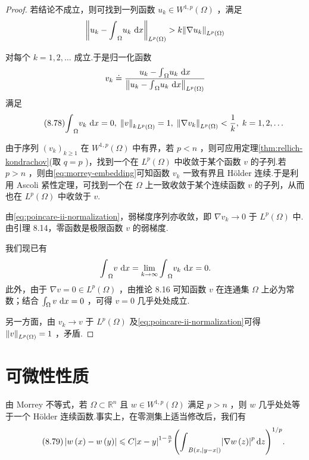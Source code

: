 \begin{proof}
若结论不成立，则可找到一列函数 ${u}_{k} \in  {W}^{1,p}\left( \Omega \right)$ ，满足
\[
\norm{{u}_{k} - {\int }_{\Omega }{u}_{k}\,\mathop{}\!\mathrm{d} x}_{{L}^{p}\left( \Omega \right) } > k\norm{\nabla {u}_{k}}_{{L}^{p}\left( \Omega \right) }
\]

对每个 $k = 1,2,\ldots$ 成立.于是归一化函数
\[
{v}_{k} \doteq  \frac{{u}_{k} - {\int }_{\Omega }{u}_{k}\,\mathop{}\!\mathrm{d} x}{\norm{{u}_{k} - {\int }_{\Omega }{u}_{k}\,\mathop{}\!\mathrm{d} x}_{{L}^{p}\left( \Omega \right) }}
\]
满足
\begin{equation}\tag{8.78}\label{eq:poincare-ii-normalization}
{\int }_{\Omega }{v}_{k}\,\mathop{}\!\mathrm{d} x = 0,\;{\norm{v}_{k}}_{{L}^{p}\left( \Omega \right) } = 1,\;{\norm{\nabla {v}_{k}}}_{{L}^{p}\left( \Omega \right) } < \frac{1}{k},\;k = 1,2,\ldots
\end{equation}

由于序列 ${\left( {v}_{k}\right) }_{k \geq  1}$ 在 ${W}^{1,p}\left( \Omega \right)$ 中有界，若 $p < n$ ，则可应用定理\ref{thm:rellich-kondrachov}(取 $q = p$ )，找到一个在 ${L}^{p}\left( \Omega \right)$ 中收敛于某个函数 $v$ 的子列.若 $p > n$ ，则由\eqref{eq:morrey-embedding}可知函数 ${v}_{k}$ 一致有界且 Hölder 连续.于是利用 Ascoli 紧性定理，可找到一个在 $\Omega$ 上一致收敛于某个连续函数 $v$ 的子列，从而也在 ${L}^{p}\left( \Omega \right)$ 中收敛于 $v$.

由\eqref{eq:poincare-ii-normalization}，弱梯度序列亦收敛，即 $\nabla {v}_{k} \to 0$ 于 ${L}^{p}\left( \Omega \right)$ 中.由引理 8.14，零函数是极限函数 $v$ 的弱梯度.

我们现已有
\[
{\int }_{\Omega }v\,\mathop{}\!\mathrm{d} x = \mathop{\lim }\limits_{{k \rightarrow  \infty }}{\int }_{\Omega }{v}_{k}\,\mathop{}\!\mathrm{d} x = 0.
\]
此外，由于 $\nabla v = 0 \in  {L}^{p}\left( \Omega \right)$ ，由推论 8.16 可知函数 $v$ 在连通集 $\Omega$ 上必为常数；结合 $\int_{\Omega } v\,\mathop{}\!\mathrm{d} x = 0$ ，可得 $v = 0$ 几乎处处成立.

另一方面，由 ${v}_{k} \to v$ 于 ${L}^{p}\left( \Omega \right)$ 及\eqref{eq:poincare-ii-normalization}可得 $\norm{v}_{{L}^{p}\left( \Omega \right) } = 1$ ，矛盾.
\end{proof}

\section{可微性性质}

由 Morrey 不等式，若 $\Omega  \subset  {\mathbb{R}}^{n}$ 且 $w \in  {W}^{1,p}\left( \Omega \right)$ 满足 $p > n$ ，则 $w$ 几乎处处等于一个 Hölder 连续函数.事实上，在零测集上适当修改后，我们有
\begin{equation}\tag{8.79}\label{eq:morrey-pointwise}
\left| {w\left( x\right)  - w\left( y\right) }\right|  \leqslant  C{\left| x - y\right| }^{1 - \frac{n}{p}}{\left( {\int }_{B\left( {x,\left| {y - x}\right| }\right) }{\left| \nabla w\left( z\right) \right| }^{p}\mathop{}\!\mathrm{d} z\right) }^{1/p}.
\end{equation}

